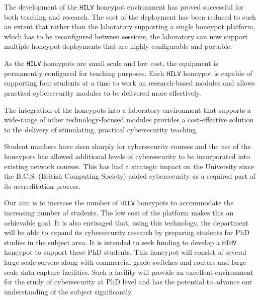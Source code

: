 \documentclass[10pt,journal]{IEEEtran}
\begin{document}
The development of the \texttt{HILV} honeypot environment has proved successful
for both teaching and research. The cost of the deployment has been reduced
to such an extent that rather than the laboratory supporting a single honeypot
platform, which has to be reconfigured between sessions, the laboratory can now
support multiple honeypot deployments that are highly configurable and
portable.

As the \texttt{HILV} honeypots are small scale and low cost, the equipment is
permanently configured for teaching purposes. Each \texttt{HILV} honeypot is
capable of supporting four students at a time to work on research-based modules
and allows practical cybersecurity modules to be delivered more effectively.

The integration of the honeypots into a laboratory environment that supports
a wide-range of other technology-focused modules provides a cost-effective
solution to the delivery of stimulating, practical cybersecurity teaching.

Student numbers have risen sharply for cybersecurity courses and the
use of the honeypots has allowed additional levels of cybersecurity to be
incorporated into existing network courses. This has had a strategic impact on
the University since the B.C.S. (British Computing Society) added
cybersecurity as a required part of its accreditation process.

Our aim is to increase the number of \texttt{HILV} honeypots to accommodate the
increasing number of students. The low cost of the platform makes this an
achievable goal. It is also envisaged that, using this technology, the
department will be able to expand its cybersecurity research by preparing
students for PhD studies in the subject area. It is intended to seek funding to
develop a \texttt{HIHV} honeypot to support these PhD students. This honeypot
will consist of several large scale servers along with commercial grade
switches and routers and large-scale data capture facilities. Such a facility
will provide an excellent environment for the study of cybersecurity at PhD
level and has the potential to advance our understanding of the subject
significantly.




\end{document}
